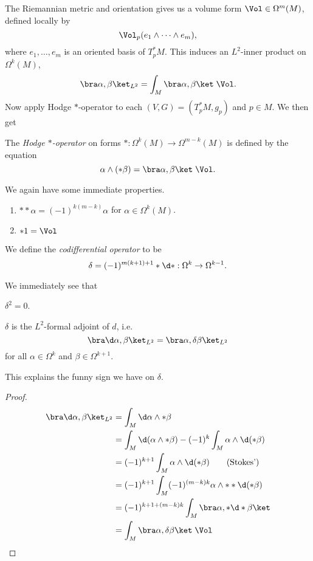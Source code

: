 \documentclass[a4paper]{article}
\begin{document}
The Riemannian metric and orientation gives us a volume form $\Vol \in \Omega^m(M)$, defined locally by
\[
  \Vol_p(e_1 \wedge \cdots \wedge e_m),
\]
where $e_1, \ldots, e_m$ is an oriented basis of $T_p^*M$. This induces an $L^2$-inner product on $\Omega^k(M)$,
\[
  \bra \alpha, \beta\ket_{L^2} = \int_M \bra \alpha, \beta\ket\;\Vol.
\]
Now apply Hodge $*$-operator to each $(V, G) = (T_p^* M, g_p)$ and $p \in M$. We then get
\begin{defi}\index{$*$}
  The \emph{Hodge $*$-operator} on forms $*: \Omega^k(M) \to \Omega^{m - k}(M)$ is defined by the equation
  \[
    \alpha \wedge (*\beta) = \bra \alpha ,\beta\ket \; \Vol.
  \]
\end{defi}

We again have some immediate properties.
\begin{prop}\leavevmode
  \begin{enumerate}
    \item $**\alpha = (-1)^{k(m - k)} \alpha$ for $\alpha \in \Omega^k(M)$.
    \item $*1 = \Vol$
  \end{enumerate}
\end{prop}

\begin{defi}\index{$\delta$}
  We define the \emph{codifferential operator} to be
  \[
    \delta = (-1)^{m(k + 1) + 1} *\d * : \Omega^k \to \Omega^{k - 1}.
  \]
\end{defi}

We immediately see that
\begin{prop}
  $\delta^2 = 0$.
\end{prop}

\begin{prop}
  $\delta$ is the $L^2$-formal adjoint of $d$, i.e.
  \[
    \bra \d \alpha, \beta\ket_{L^2} = \bra \alpha, \delta \beta\ket_{L^2}
  \]
  for all $\alpha \in \Omega^k$ and $\beta \in \Omega^{k + 1}$.
\end{prop}
This explains the funny sign we have on $\delta$.

\begin{proof}
  \begin{align*}
    \bra \d \alpha, \beta \ket_{L^2} &= \int_M \d \alpha \wedge * \beta\\
    &= \int_M \d (\alpha \wedge *\beta) - (-1)^k \int_M \alpha \wedge \d (*\beta)\\
    &= (-1)^{k + 1} \int_M \alpha \wedge \d (*\beta)\tag{Stokes'}\\
    &= (-1)^{k + 1} \int_M (-1)^{(m - k)k} \alpha \wedge **\d (*\beta)\\
    &= (-1)^{k + 1 + (m - k)k} \int_M \bra \alpha, *\d*\beta\ket\\
    &= \int_M \bra \alpha, \delta \beta \ket\;\Vol\qedhere
  \end{align*}
\end{proof}
\end{document}

